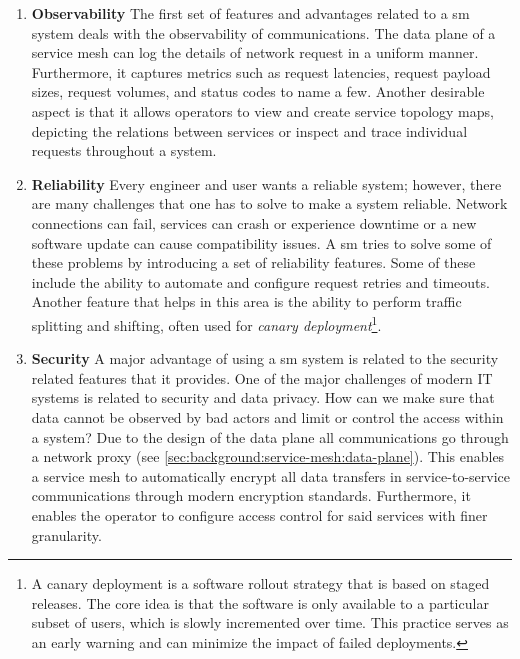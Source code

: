 \begin{enumerate}[leftmargin=3\parindent]
    \item \textbf{Observability}
    The first set of features and advantages related to a \gls{sm} system deals with the observability of communications. The data plane of a service mesh can log the details of network request in a uniform manner. Furthermore, it captures metrics such as request latencies, request payload sizes, request volumes, and status codes to name a few. Another desirable aspect is that it allows operators to view and create service topology maps, depicting the relations between services or inspect and trace individual requests throughout a system.
    
    \item \textbf{Reliability}
    Every engineer and user wants a reliable system; however, there are many challenges that one has to solve to make a system reliable. Network connections can fail, services can crash or experience downtime or a new software update can cause compatibility issues. A \gls{sm} tries to solve some of these problems by introducing a set of reliability features. Some of these include the ability to automate and configure request retries and timeouts. Another feature that helps in this area is the ability to perform traffic splitting and shifting, often used for \textit{canary deployment}\footnote{A  canary deployment is a software rollout strategy that is based on staged releases. The core idea is that the software is only available to a particular subset of users, which is slowly incremented over time. This practice serves as an early warning and can minimize the impact of failed deployments.}.

    \item \textbf{Security}
    A major advantage of using a \gls{sm} system is related to the security related features that it provides. One of the major challenges of modern IT systems is related to security and data privacy. How can we make sure that data cannot be observed by bad actors and limit or control the access within a system? Due to the design of the data plane all communications go through a network proxy (see \cref{sec:background:service-mesh:data-plane}). This enables a service mesh to automatically encrypt all data transfers in service-to-service communications through modern encryption standards. Furthermore, it enables the operator to configure access control for said services with finer granularity.
    

\end{enumerate}

